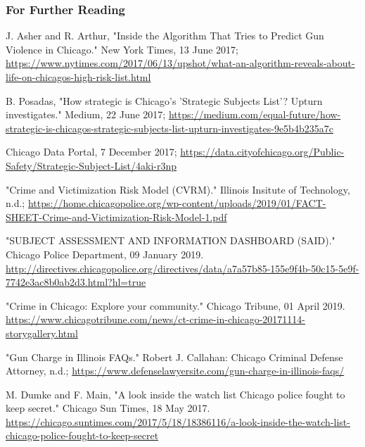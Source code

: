 \documentclass{beamer}
\newcommand{\link}[1]{{\color{blue}\href{#1}{#1}}}
\begin{document}
\begin{frame}[allowframebreaks]
  \frametitle<presentation>{For Further Reading}
    
\begin{thebibliography}{9}
J. Asher and R. Arthur, "Inside the Algorithm That Tries to Predict Gun Violence in Chicago."
New York Times, 13 June 2017;
\link{https://www.nytimes.com/2017/06/13/upshot/what-an-algorithm-reveals-about-life-on-chicagos-high-risk-list.html}

B. Posadas, "How strategic is Chicago’s 'Strategic Subjects List'? Upturn investigates."
Medium, 22 June 2017;
\link{https://medium.com/equal-future/how-strategic-is-chicagos-strategic-subjects-list-upturn-investigates-9e5b4b235a7c}

Chicago Data Portal, 7 December 2017;
\link{https://data.cityofchicago.org/Public-Safety/Strategic-Subject-List/4aki-r3np}

"Crime and Victimization Risk Model (CVRM)." Illinois Insitute of Technology, n.d.;
\link{https://home.chicagopolice.org/wp-content/uploads/2019/01/FACT-SHEET-Crime-and-Victimization-Risk-Model-1.pdf}

"SUBJECT ASSESSMENT AND INFORMATION DASHBOARD (SAID)." Chicago Police Department, 09 January 2019.
\link{http://directives.chicagopolice.org/directives/data/a7a57b85-155e9f4b-50c15-5e9f-7742e3ac8b0ab2d3.html?hl=true}

"Crime in Chicago: Explore your community." Chicago Tribune, 01 April 2019.
\link{https://www.chicagotribune.com/news/ct-crime-in-chicago-20171114-storygallery.html}

"Gun Charge in Illinois FAQs." Robert J. Callahan: Chicago Criminal Defense Attorney, n.d.; \link{https://www.defenselawyersite.com/gun-charge-in-illinois-faqs/}

M. Dumke and F. Main, "A look inside the watch list Chicago police fought to keep secret." Chicago Sun Times, 18 May 2017.
\link{https://chicago.suntimes.com/2017/5/18/18386116/a-look-inside-the-watch-list-chicago-police-fought-to-keep-secret}

\end{thebibliography}
\end{frame}
\end{document}
